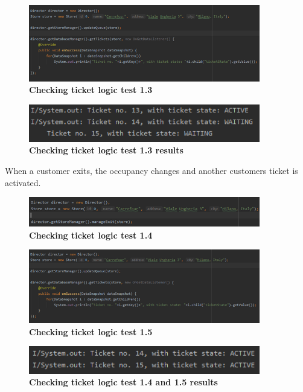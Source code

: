 \begin{itemize}
\begin{figure}[H]
\centering
\includegraphics[width=0.9\textwidth]{Images/TestingPics/Test15}
\caption{\label{fig:test21}\textbf{Checking ticket logic test 1.3}}
\end{figure}
\begin{figure}[H]
\centering
\includegraphics[width=0.9\textwidth]{Images/TestingPics/Test16}
\caption{\label{fig:test22}\textbf{Checking ticket logic test 1.3 results}}
\end{figure}

When a customer exits, the occupancy changes and another customers ticket is activated.

\begin{figure}[H]
\centering
\includegraphics[width=0.9\textwidth]{Images/TestingPics/Test17}
\caption{\label{fig:test23}\textbf{Checking ticket logic test 1.4}}
\end{figure}
\begin{figure}[H]
\centering
\includegraphics[width=0.9\textwidth]{Images/TestingPics/Test18}
\caption{\label{fig:test24}\textbf{Checking ticket logic test 1.5}}
\end{figure}
\begin{figure}[H]
\centering
\includegraphics[width=0.9\textwidth]{Images/TestingPics/Test19}
\caption{\label{fig:test25}\textbf{Checking ticket logic test 1.4 and 1.5 results}}
\end{figure}



\end{itemize}
